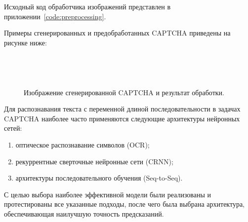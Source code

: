\documentclass{altsu-report}
\begin{document}
Исходный код обработчика изображений представлен в приложении~\ref{code:preprocessing}.

Примеры сгенерированных и предобработанных CAPTCHA приведены на рисунке ниже:

\begin{figure}[H]
    \centering
    \begin{minipage}[h]{0.45\linewidth}
         \\
    \end{minipage}
    \begin{minipage}[h]{0.45\linewidth}
         \\
    \end{minipage}
    \caption{Изображение сгенерированной CAPTCHA и результат обработки.}
    \label{fig:example-captcha}
\end{figure}

\vspace{-0.7cm}

Для распознавания текста с переменной длиной последовательности в задачах CAPTCHA наиболее часто применяются следующие архитектуры нейронных сетей:

\begin{enumerate}
    \item оптическое распознавание символов (OCR);
    \item рекуррентные сверточные нейронные сети (CRNN);
    \item архитектуры последовательного обучения (Seq-to-Seq).
\end{enumerate}

С целью выбора наиболее эффективной модели были реализованы и протестированы все указанные подходы, после чего была выбрана архитектура, обеспечивающая наилучшую точность предсказаний.
\end{document}
